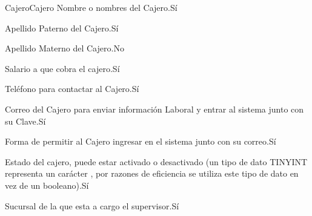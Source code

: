 \begin{cdtEntidad}{Cajero}{Cajero}
		{Nombre o nombres del Cajero.}{Sí}
		
		{Apellido Paterno del Cajero.}{Sí}
		
		{Apellido Materno del Cajero.}{No}
		
		{Salario a que cobra el cajero.}{Sí}
		
		{Teléfono para contactar al Cajero.}{Sí}
		
		{Correo del Cajero para enviar información Laboral y entrar al sistema junto con su Clave.}{Sí}
		
		{Forma de permitir al Cajero ingresar en el sistema junto con su correo.}{Sí}
	
		{Estado del cajero, puede estar activado o desactivado (un tipo de dato TINYINT representa un carácter , por razones de eficiencia se utiliza este tipo de dato en vez de un booleano).}{Sí}	
	
		{Sucursal de la que esta a cargo el supervisor.}{Sí}

		\cdtEntityRelSection
\end{cdtEntidad}

